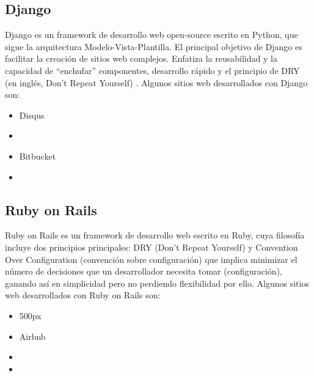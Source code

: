 \subsection{Django}
Django es un framework de desarrollo web open-source escrito en Python, que sigue la arquitectura Modelo-Vista-Plantilla. El principal objetivo de Django es facilitar la creación de sitios web complejos. Enfatiza la reusabilidad y la capacidad de “enchufar” componentes, desarrollo rápido y el principio de DRY (en  inglés, Don’t Repeat Yourself) \cite{Holovaty2009-jr}. Algunos sitios web desarrollados con Django son:
\begin{itemize}
    \item Disqus \cite{Robenolt2013-cb}
    \item {}
    \item Bitbucket \cite{Django2012-bt}
    \item {}
\end{itemize}

\subsection{Ruby on Rails}
Ruby on Rails es un framework de desarrollo web escrito en Ruby, cuya filosofía incluye dos principios principales: DRY (Don’t Repeat Yourself) y Convention Over Configuration (convención sobre configuración) que implica minimizar el número de decisiones que un desarrollador necesita tomar (configuración), ganando así en simplicidad pero no perdiendo flexibilidad por ello.
Algunos sitios web desarrollados con Ruby on Rails son:
\begin{itemize}
    \item 500px \cite{Liu2015-dx}
    \item Airbnb \cite{Weksler2015-ip}
    \item {}
    \item {}
\end{itemize}
